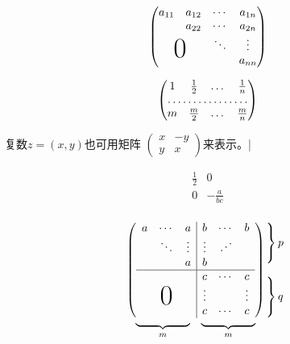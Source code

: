 \documentclass{ctexart}%
\newcommand{\adots}{\mathinner{\mkern2mu%
		\raisebox{0.1em}{.}\mkern2mu\raisebox{0.4em}{.}%
		\mkern2mu\raisebox{0.7em}{.}\mkern1mu}}
\begin{document}
	\[ \begin{pmatrix}
		a_ {11} & a_ {12} & \cdots & a_{1n} \\
		& a_{22} & \cdots &a_{2n} \\
		& & \ddots & \vdots \\
		\multicolumn{2}{c}{\raisebox{1.3ex}[0pt]{\Huge 0}}
		& &a_{nn}
	\end{pmatrix}
	\]
	
	
	\[
	\begin{pmatrix}
		1&\frac12&\dots&\frac1n\\
		\hdotsfor{4} \\
		m &\frac m2 & \dots & \frac mn
	\end{pmatrix}
	\]
	
	复数$z = (x,y)$也可用矩阵
	\begin{math}
		\left(%
		\begin{smallmatrix}
			x&-y\\y&x
		\end{smallmatrix}
		\right)%
	\end{math}来表示。|
	
	\[
	\begin{array}{r|r}
		\frac{1}{2} & 0 \\
		\hline
		0 & -\frac a{bc} \\
	\end{array}
	\]
	
	\[
	\begin{array}{c@{\hspace{-5pt}}l}
		\left(
		\begin{array}{ccc|ccc}
			a&\cdots&a&b&\cdots&b\\
			& \ddots & \vdots & \vdots & \adots\\
			& & a &b\\ \hline
			& & & c & \cdots & c\\
			& & & \vdots & & \vdots\\
			\multicolumn{3}{c|}{\raisebox{2ex}[0pt]{\Huge0}}
			& c & \cdots & c
		\end{array}
		\right)
		&
		\begin{array}{l}
			\left. \rule{ 0mm}{7mm}\right\}p\\
			\\
			\left. \rule{0mm}{7mm}\right\}q
		\end{array}
		\\[-5pt]
		\begin{array}{cc}
			\underbrace{\rule{17mm}{0mm}}_ m &
			\underbrace{\rule{17mm}{0mm}}_ m
		\end{array}
		& %
	\end{array}
	\]
	
\end{document}
